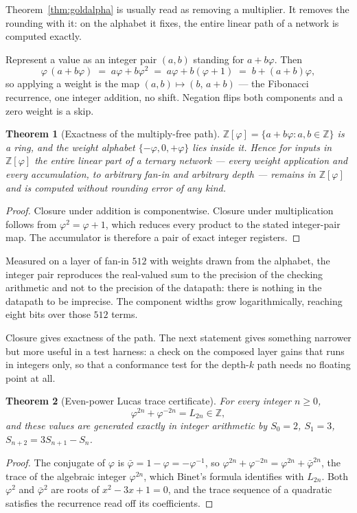 \documentclass[11pt]{article}
\newtheorem{theorem}{Theorem}
\theoremstyle{definition}
\begin{document}
\label{sec:exact}

Theorem~\ref{thm:goldalpha} is usually read as removing a multiplier. It removes
the rounding with it: on the alphabet it fixes, the entire linear path of a
network is computed exactly.

Represent a value as an integer pair $(a,b)$ standing for $a + b\varphi$. Then
\[
  \varphi\,(a + b\varphi) \;=\; a\varphi + b\varphi^{2} \;=\; a\varphi + b(\varphi+1)
  \;=\; b + (a+b)\varphi ,
\]
so applying a weight is the map $(a,b) \mapsto (b,\,a+b)$ --- the Fibonacci
recurrence, one integer addition, no shift. Negation flips both components and a
zero weight is a skip.

\begin{theorem}[Exactness of the multiply-free path]
\label{thm:exact}
$\mathbb{Z}[\varphi] = \{a + b\varphi : a,b \in \mathbb{Z}\}$ is a ring, and the
weight alphabet $\{-\varphi,0,+\varphi\}$ lies inside it. Hence for inputs in
$\mathbb{Z}[\varphi]$ the entire linear part of a ternary network --- every
weight application and every accumulation, to arbitrary fan-in and arbitrary
depth --- remains in $\mathbb{Z}[\varphi]$ and is computed \emph{without
rounding error of any kind}.
\end{theorem}
\begin{proof}
Closure under addition is componentwise. Closure under multiplication follows
from $\varphi^2 = \varphi + 1$, which reduces every product to the stated
integer-pair map. The accumulator is therefore a pair of exact integer registers.
\end{proof}

Measured on a layer of fan-in $512$ with weights drawn from the alphabet, the
integer pair reproduces the real-valued sum to the precision of the checking
arithmetic and not to the precision of the datapath: there is nothing in the
datapath to be imprecise. The component widths grow logarithmically, reaching
eight bits over those $512$ terms.

Closure gives exactness of the path. The next statement gives something narrower
but more useful in a test harness: a check on the composed layer gains that runs
in integers only, so that a conformance test for the depth-$k$ path needs no
floating point at all.

\begin{theorem}[Even-power Lucas trace certificate]
\label{thm:lucas-trace}
For every integer $n\geq0$,
\[
 \varphi^{2n}+\varphi^{-2n}=L_{2n}\in\mathbb{Z},
\]
and these values are generated exactly in integer arithmetic by $S_0=2$,
$S_1=3$, $S_{n+2}=3S_{n+1}-S_n$.
\end{theorem}
\begin{proof}
The conjugate of $\varphi$ is $\bar\varphi=1-\varphi=-\varphi^{-1}$, so
$\varphi^{2n}+\varphi^{-2n}=\varphi^{2n}+\bar\varphi^{2n}$, the trace of the
algebraic integer $\varphi^{2n}$, which Binet's formula identifies with $L_{2n}$.
Both $\varphi^{2}$ and $\bar\varphi^{2}$ are roots of $x^{2}-3x+1=0$, and the
trace sequence of a quadratic satisfies the recurrence read off its coefficients.
\end{proof}
\end{document}
